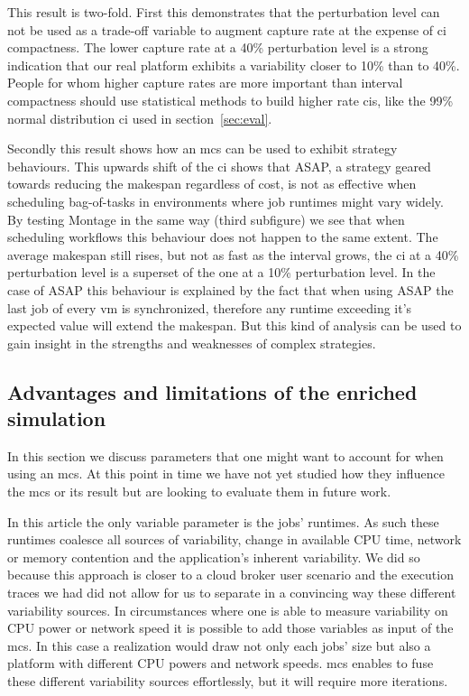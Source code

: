 \documentclass[10pt,conference,compsocconf]{IEEEtran}
\begin{document}
This result is two-fold. First this demonstrates that the perturbation level can
not be used as a trade-off variable to augment capture rate at the expense of
\ac{ci} compactness. The lower capture rate at a 40\% perturbation level is a
strong indication that our real platform exhibits a variability closer to
10\% than to 40\%. People for whom higher capture rates are more important than
interval compactness should use statistical methods to build higher rate \acp{ci},
like the 99\% normal distribution \ac{ci} used in section~\ref{sec:eval}.

Secondly this result shows how an \ac{mcs} can be used to exhibit strategy
behaviours. This upwards shift of the \ac{ci} shows that ASAP, a strategy
geared towards reducing the makespan regardless of cost, is not as effective
when scheduling bag-of-tasks in environments where job runtimes might vary
widely. By testing Montage in the same way (third subfigure) we see that when
scheduling workflows this behaviour does not happen to the same extent. The
average makespan still rises, but not as fast as the interval grows, the \ac{ci}
at a 40\% perturbation level is a superset of the one at a 10\% perturbation
level. In the case of ASAP this behaviour is explained by the
fact that when using ASAP the last job of every \ac{vm} is synchronized,
therefore any runtime exceeding it's expected value will extend the makespan.
But this kind of analysis can be used to gain insight in the strengths and
weaknesses of complex strategies.


\subsection{Advantages and limitations of the enriched simulation}\label{sec:lim}

In this section we discuss parameters that one might want to account for when
using an \ac{mcs}. At this point in time we have not yet studied how they
influence the \ac{mcs} or its result but are looking to evaluate them in
future work.

In this article the only variable parameter is the jobs' runtimes. As such these
runtimes coalesce all sources of variability, change in available CPU time,
network or memory contention and the application's inherent variability. We did so
because this approach is closer to a cloud broker user scenario and  the
execution traces we had did not allow for us to separate in a convincing way these
different variability sources. In circumstances where one is able to measure variability
on CPU power or network speed it is possible to add those variables as input of
the \ac{mcs}. In this case a realization would draw not only each jobs' size 
 but also a platform with different CPU powers and network speeds.
\ac{mcs} enables to fuse these different variability sources effortlessly, but it will
require more iterations. 
\end{document}
